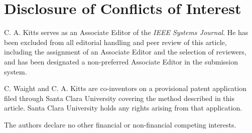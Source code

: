 \documentclass[lettersize,journal]{IEEEtran}
\begin{document}
\section*{Disclosure of Conflicts of Interest}

C. A. Kitts serves as an Associate Editor of the \textit{IEEE Systems Journal}. He has been excluded from all editorial handling and peer review of this article, including the assignment of an Associate Editor and the selection of reviewers, and has been designated a non-preferred Associate Editor in the submission system.

C. Waight and C. A. Kitts are co-inventors on a provisional patent application filed through Santa Clara University covering the method described in this article. Santa Clara University holds any rights arising from that application.

The authors declare no other financial or non-financial competing interests.
\end{document}

